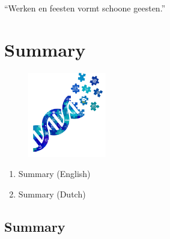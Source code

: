 \cleartorightpage
\begin{savequote}[75mm]
``Werken en feesten vormt schoone geesten.''
\end{savequote}

\chapter{Summary}\label{chapter:summary}
\setcounter{figure}{-1}
\setcounter{table}{-1}
\setcounter{section}{-1}
\setcounter{NAT@ctr}{-1}

\begin{figure}[t!]
\includegraphics[height=10em]{frontmatter/images/samenvatting.png}
\end{figure}

\begin{enumerate}[label=\ref{chapter:summary}.\arabic*]
\itemsep-0.5em
\setcounter{enumi}{-1}
\item Summary (English)
\item Summary (Dutch)
\end{enumerate}


\section{Summary}

